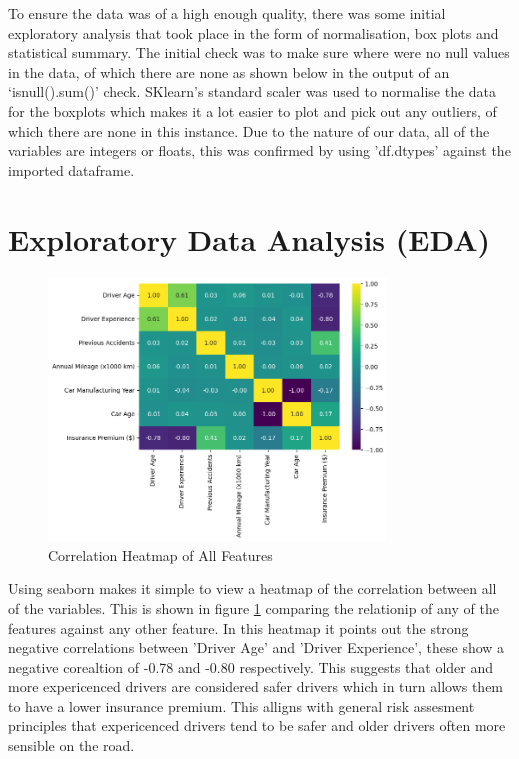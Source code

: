 \documentclass{article}
\begin{document}
To ensure the data was of a high enough quality, there was some initial exploratory analysis that took place in the form of normalisation, box plots and statistical summary. The initial check was to make sure where were no null values in the data, of which there are none as shown below in the output of an `isnull().sum()' check. SKlearn's standard scaler \cite{scikit_scaler} was used to normalise the data for the boxplots which makes it a lot easier to plot and pick out any outliers, of which there are none in this instance. Due to the nature of our data, all of the variables are integers or floats, this was confirmed by using 'df.dtypes' against the imported dataframe.


\section{Exploratory Data Analysis (EDA)}

\begin{figure}[h]
\centering
\includegraphics[width=0.8\textwidth]{heatmap.png}
\caption{Correlation Heatmap of All Features}\label{fig:heatmap}
\end{figure}

Using seaborn makes it simple to view a heatmap of the correlation between all of the variables. This is shown in figure \ref{fig:heatmap} comparing the relationip of any of the features against any other feature. In this heatmap it points out the strong negative correlations between 'Driver Age' and 'Driver Experience', these show a negative corealtion of -0.78 and -0.80 respectively. This suggests that older and more expericenced drivers are considered safer drivers which in turn allows them to have a lower insurance premium. This alligns with general risk assesment principles that expericenced drivers tend to be safer and older drivers often more sensible on the road. 
\end{document}
